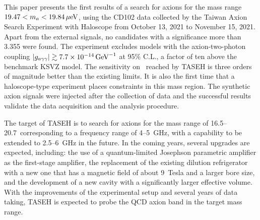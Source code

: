 This paper presents the first results of a search for axions for the mass 
range $19.47 < m_a < 19.84 \,\mu\text{e\hspace{-.08em}V}$, using the CD102 data collected by the 
Taiwan Axion Search Experiment with Haloscope from October 13, 2021 
to November 15, 2021. 
Apart from the external signals, no candidates with a significance more than
3.355 were found. The experiment excludes models with the 
axion-two-photon coupling $\left|g_{a\gamma\gamma}\right|\gtrsim 7.7\times 10^{-14}\,\text{Ge\hspace{-.08em}V}^{-1}$ at 95\% C.L.,
 a factor of ten 
above the benchmark KSVZ model. The sensitivity on \gagg\ reached by TASEH 
is three orders of magnitude better than the existing limits. 
It is also the first time that a haloscope-type experiment places 
constraints in this mass region. The synthetic 
axion signals were injected after the collection of data and the 
successful results validate the data acquisition and the analysis procedure. 

The target of TASEH is to search for axions for the mass range of 
16.5--20.7\muevcc\ corresponding to a frequency range of 4--5~GHz, with a 
capability to be extended to 2.5--6~GHz in the future. 
In the coming years, several upgrades are expected, including: the use of a 
quantum-limited Josephson parametric amplifier as the first-stage amplifier, 
the replacement of the existing dilution refrigerator with a new one that has 
a magnetic field of about 9~Tesla and a larger bore size, and the development 
of a new cavity with a significantly larger effective volume. %
With the improvements of the experimental setup and several years of data 
taking, TASEH is expected to probe the QCD axion band in the target mass range.


